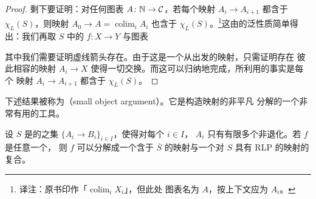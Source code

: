 \begin{proof}
剩下要证明：对任何图表 $A\colon \mathbb{N} \to \mathcal{C}$，若每个映射 $A_i \to A_{i+1}$ 都含于
$\chi_L(S)$，则映射 $A_0 \to A = \operatorname{colim}_i A_i$ 也含于
$\chi_L(S)$。\footnote{译注：原书印作「$\operatorname{colim}_i X_i$」，但此处
图表名为 $A$，按上下文应为 $A_i$。}这由\trColimit{}的泛性质简单得出：我们再取
$S$ 中的 $f\colon X \to Y$ 与图表
\begin{center}
\end{center}
其中我们需要证明虚线箭头存在。由于这是一个从\trColimit{}出发的映射，只需证明存在
彼此相容的映射 $A_i \to X$ 使得一切交换。而这可以归纳地完成，所利用的事实是每个
映射 $A_i \to A_{i+1}$ 都含于 $\chi_L(S)$。
\end{proof}

下述结果被称为\emph{\trSmallObjectArgument{}}（small object argument）。它是构造映射的非平凡
分解的一个非常有用的工具。

\begin{proposition}\label{prop:small-object-argument}
设 $S$ 是\trSimplicialSet{}的\trMorphism{}之集 $\{A_i \to B_i\}_{i \in I}$，使得对每个
$i \in I$，\trSimplicialSet{} $A_i$ 只有有限多个非退化\trSimplex{}。若 $f$ 是任意一个\trMorphism{}，
则 $f$ 可以分解成一个含于 $\overline{S}$ 的映射与一个对 $S$ 具有 RLP 的映射的
复合。
\end{proposition}

